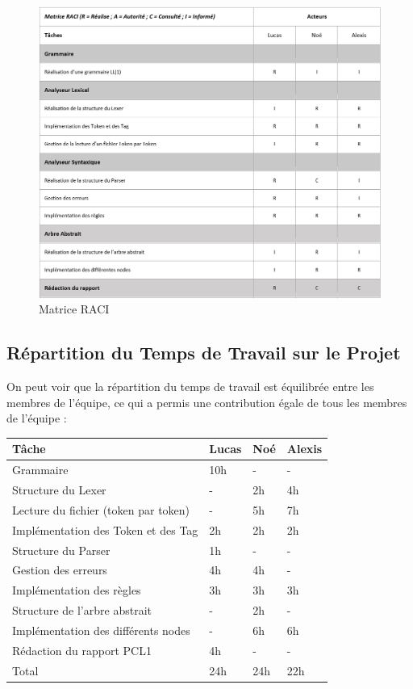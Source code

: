 \documentclass[french,a4paper]{article}
\begin{document}
    \begin{figure}[H]
        \centering
        \includegraphics[width=1\textwidth]{RACI}
        \caption{Matrice RACI}\label{fig:figure3}
    \end{figure}

    \subsection{Répartition du Temps de Travail sur le Projet}\label{subsec:repartition-du-temps-de-travail-sur-le-projet}

    On peut voir que la répartition du temps de travail est équilibrée entre les membres de l'équipe, ce qui a permis une contribution égale de tous les membres de l'équipe :
    \newline

    \begin{tabular}{@{}llll@{}}
        \toprule
        Tâche & Lucas & Noé & Alexis \\ \midrule
        Grammaire & 10h & - & - \\
        Structure du Lexer & - & 2h & 4h \\
        Lecture du fichier (token par token) & - & 5h & 7h \\
        Implémentation des Token et des Tag & 2h & 2h & 2h \\
        Structure du Parser & 1h & - & - \\
        Gestion des erreurs & 4h & 4h & - \\
        Implémentation des règles & 3h & 3h & 3h \\
        Structure de l'arbre abstrait & - & 2h & - \\
        Implémentation des différents nodes & - & 6h & 6h \\
        Rédaction du rapport PCL1 & 4h & - & - \\
        \midrule
        Total & 24h & 24h & 22h \\ \bottomrule
    \end{tabular}
\end{document}
